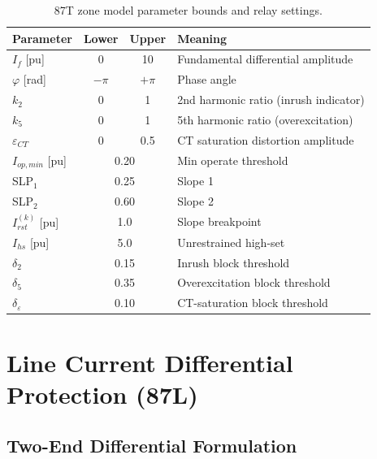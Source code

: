 \documentclass[12pt,a4paper]{article}
\newcommand{\Irst}{I_{rst}}
\begin{document}
\begin{table}[h!]
\centering
\caption{87T zone model parameter bounds and relay settings.}
\label{tab:87T_bounds}
\begin{tabular}{lccl}
\toprule
Parameter & Lower & Upper & Meaning\\
\midrule
$I_f$ [pu]         & 0     & 10    & Fundamental differential amplitude\\
$\varphi$ [rad]    & $-\pi$& $+\pi$& Phase angle\\
$k_2$              & 0     & 1     & 2nd harmonic ratio (inrush indicator)\\
$k_5$              & 0     & 1     & 5th harmonic ratio (overexcitation)\\
$\varepsilon_{CT}$ & 0     & 0.5   & CT saturation distortion amplitude\\
\midrule
$I_{op,min}$ [pu]  & \multicolumn{2}{c}{0.20} & Min operate threshold\\
SLP$_1$            & \multicolumn{2}{c}{0.25} & Slope 1\\
SLP$_2$            & \multicolumn{2}{c}{0.60} & Slope 2\\
$\Irst^{(k)}$ [pu] & \multicolumn{2}{c}{1.0}  & Slope breakpoint\\
$I_{hs}$ [pu]      & \multicolumn{2}{c}{5.0}  & Unrestrained high-set\\
$\delta_2$         & \multicolumn{2}{c}{0.15} & Inrush block threshold\\
$\delta_5$         & \multicolumn{2}{c}{0.35} & Overexcitation block threshold\\
$\delta_\varepsilon$&\multicolumn{2}{c}{0.10} & CT-saturation block threshold\\
\bottomrule
\end{tabular}
\end{table}

\section{Line Current Differential Protection (87L)}
\label{sec:87L}

\subsection{Two-End Differential Formulation}
\label{sec:87L_formulation}
\end{document}
